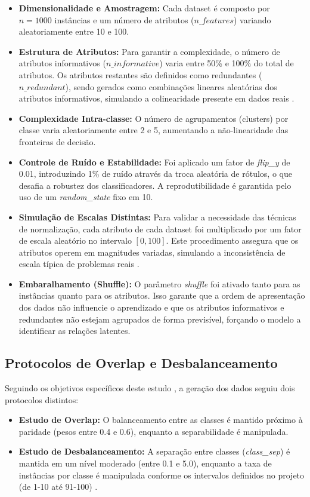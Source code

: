 \begin{itemize}
	\item \textbf{Dimensionalidade e Amostragem:} Cada dataset é composto por $n=1000$ instâncias e um número de atributos ($n\_features$) variando aleatoriamente entre 10 e 100. 
	\item \textbf{Estrutura de Atributos:} Para garantir a complexidade, o número de atributos informativos ($n\_informative$) varia entre 50\% e 100\% do total de atributos. Os atributos restantes são definidos como redundantes ($n\_redundant$), sendo gerados como combinações lineares aleatórias dos atributos informativos, simulando a colinearidade presente em dados reais \cite{Amorim2023}.
	\item \textbf{Complexidade Intra-classe:} O número de agrupamentos (clusters) por classe varia aleatoriamente entre 2 e 5, aumentando a não-linearidade das fronteiras de decisão.
	\item \textbf{Controle de Ruído e Estabilidade:} Foi aplicado um fator de \textit{flip\_y} de 0.01, introduzindo 1\% de ruído através da troca aleatória de rótulos, o que desafia a robustez dos classificadores. A reprodutibilidade é garantida pelo uso de um \textit{random\_state} fixo em 10.
	\item \textbf{Simulação de Escalas Distintas:} Para validar a necessidade das técnicas de normalização, cada atributo de cada dataset foi multiplicado por um fator de escala aleatório no intervalo $[0, 100]$. Este procedimento assegura que os atributos operem em magnitudes variadas, simulando a inconsistência de escala típica de problemas reais \cite{Projeto2025, Amorim2023}.
	\item \textbf{Embaralhamento (Shuffle):} O parâmetro \textit{shuffle} foi ativado tanto para as instâncias quanto para os atributos. Isso garante que a ordem de apresentação dos dados não influencie o aprendizado e que os atributos informativos e redundantes não estejam agrupados de forma previsível, forçando o modelo a identificar as relações latentes.
\end{itemize}

\subsection{Protocolos de Overlap e Desbalanceamento}

Seguindo os objetivos específicos deste estudo \cite{Projeto2025}, a geração dos dados seguiu dois protocolos distintos:

\begin{itemize}
	\item \textbf{Estudo de Overlap:} O balanceamento entre as classes é mantido próximo à paridade (pesos entre 0.4 e 0.6), enquanto a separabilidade é manipulada.
	\item \textbf{Estudo de Desbalanceamento:} A separação entre classes (\textit{class\_sep}) é mantida em um nível moderado (entre 0.1 e 5.0), enquanto a taxa de instâncias por classe é manipulada conforme os intervalos definidos no projeto (de 1-10 até 91-100) \cite{Projeto2025, Amorim2023}.
\end{itemize}

